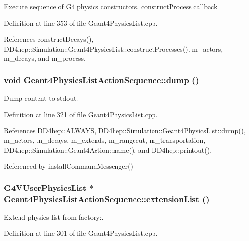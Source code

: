 Execute sequence of G4 physics constructors. constructProcess callback 

Definition at line 353 of file Geant4PhysicsList.cpp.

References constructDecays(), DD4hep::Simulation::Geant4PhysicsList::constructProcesses(), m\_\-actors, m\_\-decays, and m\_\-process.\hypertarget{class_d_d4hep_1_1_simulation_1_1_geant4_physics_list_action_sequence_a15c69e0f4c07f3188c37c7732f6ff6c7}{
\subsubsection[{dump}]{\setlength{\rightskip}{0pt plus 5cm}void Geant4PhysicsListActionSequence::dump ()}}
\label{class_d_d4hep_1_1_simulation_1_1_geant4_physics_list_action_sequence_a15c69e0f4c07f3188c37c7732f6ff6c7}


Dump content to stdout. 

Definition at line 321 of file Geant4PhysicsList.cpp.

References DD4hep::ALWAYS, DD4hep::Simulation::Geant4PhysicsList::dump(), m\_\-actors, m\_\-decays, m\_\-extends, m\_\-rangecut, m\_\-transportation, DD4hep::Simulation::Geant4Action::name(), and DD4hep::printout().

Referenced by installCommandMessenger().\hypertarget{class_d_d4hep_1_1_simulation_1_1_geant4_physics_list_action_sequence_a51078548bbd59fa3cb1447d2b2c6e2fb}{
\subsubsection[{extensionList}]{\setlength{\rightskip}{0pt plus 5cm}G4VUserPhysicsList $\ast$ Geant4PhysicsListActionSequence::extensionList ()}}
\label{class_d_d4hep_1_1_simulation_1_1_geant4_physics_list_action_sequence_a51078548bbd59fa3cb1447d2b2c6e2fb}


Extend physics list from factory:. 

Definition at line 301 of file Geant4PhysicsList.cpp.

